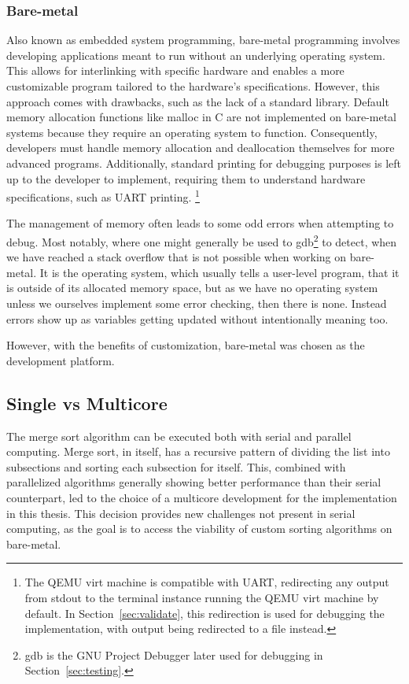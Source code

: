 \subsubsection{Bare-metal}\label{sec:bare-metal}
Also known as embedded system programming, bare-metal programming involves
developing applications meant to run without an underlying operating system. This
allows for interlinking with specific hardware and enables a more customizable
program tailored to the hardware's specifications. However, this approach comes
with drawbacks, such as the lack of a standard library. Default memory
allocation functions like malloc in C are not implemented on bare-metal systems
because they require an operating system to function. Consequently, developers
must handle memory allocation and deallocation themselves for more advanced
programs. Additionally, standard printing for debugging purposes is left up to
the developer to implement, requiring them to understand hardware
specifications, such as UART printing. \cite{uart}
\footnote{The QEMU virt machine is compatible with UART, redirecting any output
  from stdout
to the terminal instance running the QEMU virt machine by default. In
Section~\ref{sec:validate}, this redirection is used for debugging the
implementation, with output being redirected to a file instead.}

The management of memory often leads to some odd errors when attempting to
debug. Most notably, where one might generally be used to gdb\footnote{gdb is
the GNU Project Debugger later used for debugging in Section~\ref{sec:testing}.}
to detect, when we have reached a stack overflow that is not possible when
working on bare-metal. It is the operating system, which usually tells a
user-level program, that it is outside of its allocated memory space, but as we
have no operating system unless we ourselves implement some error checking, then
there is none. Instead errors show up as variables getting updated without
intentionally meaning too.

However, with the benefits of customization, bare-metal was chosen as the
development platform.

\subsection{Single vs Multicore}\label{sec:singlevsmulti}
The merge sort algorithm can be executed both with serial and parallel
computing. Merge sort, in itself, has a recursive pattern of dividing the list
into subsections and sorting each subsection for itself. This, combined with
parallelized algorithms generally showing better performance than their serial
counterpart, led to the choice of a multicore development for the implementation
in this thesis. \cite{comp_parallel} This decision provides new challenges not
present in serial computing, as the goal is to access the viability of
custom sorting algorithms on bare-metal.


